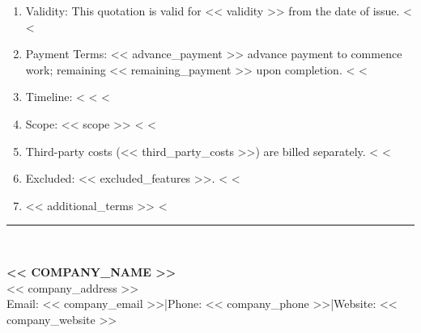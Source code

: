 \documentclass[12pt]{article}
\newcommand{\companyname}{<< company_name >>}
\newcommand{\companyaddress}{<< company_address >>}
\newcommand{\companywebsite}{<< company_website >>}
\newcommand{\companyemail}{<< company_email >>}
\newcommand{\companyphone}{<< company_phone >>}
\begin{document}
\begin{enumerate}
    <%
    \item Validity: This quotation is valid for << validity >> from the date of issue.
    <%
    <%
    \item Payment Terms: << advance_payment >> advance payment to commence work; remaining << remaining_payment >> upon completion.
    <%
    <%
    \item Timeline: <%
    <%
    <%
    \item Scope: << scope >>
    <%
    <%
    \item Third-party costs (<< third_party_costs >>) are billed separately.
    <%
    <%
    \item Excluded: << excluded_features >>.
    <%
    <%
    \item << additional_terms >>
    <%
\end{enumerate}

\vfill
\noindent\rule{\textwidth}{0.4pt}\\[2pt]
\begin{center}
    \textbf{\MakeUppercase{\companyname}}\\[2pt]
    \small \companyaddress\\[2pt]
    \small Email: \companyemail \quad|\quad Phone: \companyphone \quad|\quad Website: \companywebsite
\end{center}
\end{document}
